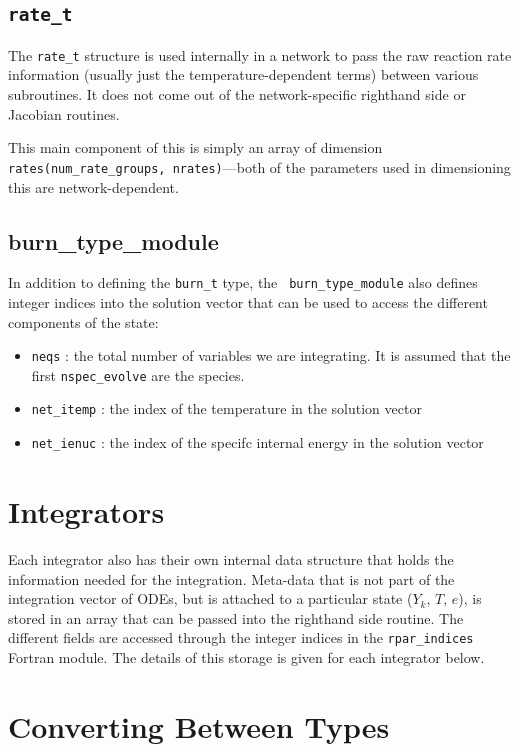 \subsection{{\tt rate\_t}}

The {\tt rate\_t} structure is used internally in a network to pass
the raw reaction rate information (usually just the
temperature-dependent terms) between various subroutines.  It does not
come out of the network-specific righthand side or Jacobian routines.

This main component of this is simply an array of dimension {\tt
  rates(num\_rate\_groups, nrates)}---both of the parameters
used in dimensioning this are network-dependent.


\subsection{{burn\_type\_module}}

In addition to defining the {\tt burn\_t} type, the {\tt
  burn\_type\_module} also defines integer indices into the solution
vector that can be used to access the different components of the
state:
\begin{itemize}
  \item {\tt neqs} : the total number of variables we are integrating.
    It is assumed that the first {\tt nspec\_evolve} are the species.

  \item {\tt net\_itemp} : the index of the temperature in the
    solution vector

  \item {\tt net\_ienuc} : the index of the specifc internal energy
    in the solution vector
\end{itemize}

\section{Integrators}

Each integrator also has their own internal data structure that holds
the information needed for the integration.  Meta-data that is not
part of the integration vector of ODEs, but is attached to a
particular state ($Y_k$, $T$, $e$), is stored in an array that can be
passed into the righthand side routine.  The different fields are
accessed through the integer indices in the {\tt rpar\_indices}
Fortran module.  The details of this storage is given for each
integrator below.


\section{Converting Between Types}

